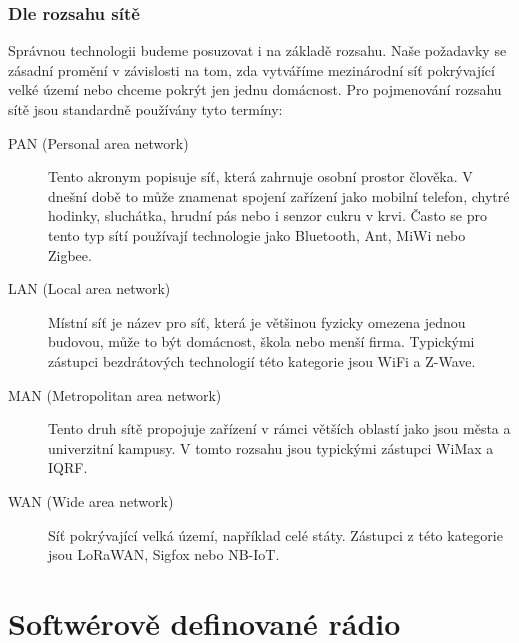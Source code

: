 \documentclass{ctuthesis}
\begin{document}
\subsection{Dle rozsahu sítě}
Správnou technologii budeme posuzovat i na základě rozsahu. Naše požadavky se zásadní promění v závislosti na tom, zda vytváříme mezinárodní síť pokrývající velké území nebo chceme pokrýt jen jednu domácnost. Pro pojmenování rozsahu sítě jsou standardně používány tyto termíny:
\begin{description}
\item [PAN (Personal area network)]
Tento akronym popisuje síť, která zahrnuje osobní prostor člověka. V dnešní době to může znamenat spojení zařízení jako mobilní telefon, chytré hodinky, sluchátka, hrudní pás nebo i senzor cukru v krvi. Často se pro tento typ sítí používají technologie jako Bluetooth, Ant, MiWi nebo Zigbee.

\item [LAN (Local area network)]
Místní síť je název pro síť, která je většinou fyzicky omezena jednou budovou, může to být domácnost, škola nebo menší firma. Typickými zástupci bezdrátových technologií této kategorie jsou WiFi a Z-Wave.

\item [MAN (Metropolitan area network)]
Tento druh sítě propojuje zařízení v rámci větších oblastí jako jsou města a univerzitní kampusy. V tomto rozsahu jsou typickými zástupci WiMax a IQRF.

\item [WAN (Wide area network)]
Síť pokrývající velká území, například celé státy. Zástupci z této kategorie jsou LoRaWAN, Sigfox nebo NB-IoT.
\end{description}

\chapter{Softwérově definované rádio} \label{chapter:sdr}
\end{document}
